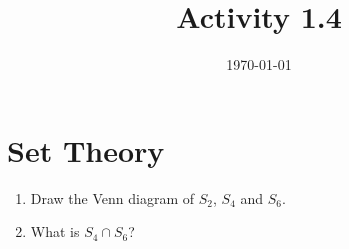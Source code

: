 \documentclass[12pt]{amsart}
\title{Activity 1.4}
\date{\today}
\begin{document}
\maketitle
\part*{Set Theory}
\begin{enumerate}
\item Draw the Venn diagram of $S_2$, $S_4$ and $S_6$.
\item What is $S_4\cap S_6$?
\end{enumerate}  
\end{document}

